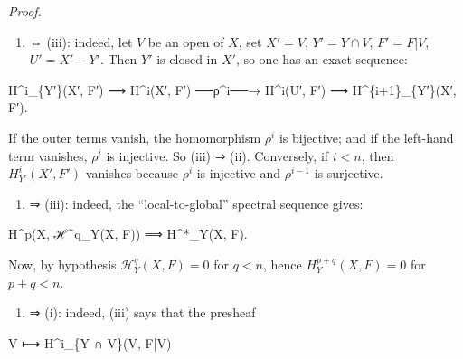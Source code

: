 \documentclass[
  11pt,
  a4paper,
]{book}
\newenvironment{Shaded}{}{}
\newcommand{\NormalTok}[1]{#1}
\providecommand{\tightlist}{%
  \setlength{\itemsep}{0pt}\setlength{\parskip}{0pt}}
\begin{document}
\emph{Proof.}

\begin{enumerate}
\def\labelenumi{(\roman{enumi})}
\setcounter{enumi}{1}
\tightlist
\item
  ⇔ (iii): indeed, let \(V\) be an open of \(X\), set \(X' = V\),
  \(Y' = Y \cap V\), \(F' = F|V\), \(U' = X' - Y'\). Then \(Y'\) is
  closed in \(X'\), so one has an exact sequence:
\end{enumerate}

\begin{Shaded}
\begin{Highlighting}[]
\NormalTok{H\^{}i\_\{Y′\}(X′, F′) ⟶ H\^{}i(X′, F′) ──ρ\^{}i──→ H\^{}i(U′, F′) ⟶ H\^{}\{i+1\}\_\{Y′\}(X′, F′).}
\end{Highlighting}
\end{Shaded}

If the outer terms vanish, the homomorphism \(\rho^{i}\) is bijective;
and if the left-hand term vanishes, \(\rho^{i}\) is injective. So (iii)
⇒ (ii). Conversely, if \(i < n\), then \(H^{i}_{Y'}(X', F')\) vanishes
because \(\rho^{i}\) is injective and \(\rho^{i-1}\) is surjective.

\begin{enumerate}
\def\labelenumi{(\roman{enumi})}
\tightlist
\item
  ⇒ (iii): indeed, the ``local-to-global'' spectral sequence gives:
\end{enumerate}

\begin{Shaded}
\begin{Highlighting}[]
\NormalTok{H\^{}p(X, ℋ\^{}q\_Y(X, F)) ⟹ H\^{}*\_Y(X, F).}
\end{Highlighting}
\end{Shaded}

Now, by hypothesis \(\mathcal{H}^{q}_{Y}(X, F) = 0\) for \(q < n\),
hence \(H^{p+q}_{Y}(X, F) = 0\) for \(p + q < n\).

\begin{enumerate}
\def\labelenumi{(\roman{enumi})}
\setcounter{enumi}{2}
\tightlist
\item
  ⇒ (i): indeed, (iii) says that the presheaf
\end{enumerate}

\begin{Shaded}
\begin{Highlighting}[]
\NormalTok{V ⟼ H\^{}i\_\{Y ∩ V\}(V, F|V)}
\end{Highlighting}
\end{Shaded}
\end{document}

